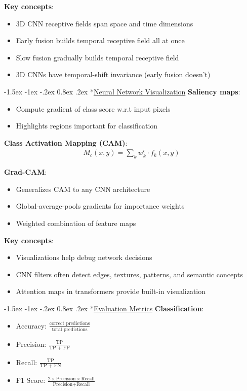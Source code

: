 \documentclass{article}
\makeatletter
\renewcommand\section{\@startsection{section}{1}{\z@}%
                                  {-1.5ex \@plus -1ex \@minus -.2ex}%
                                  {0.8ex \@plus.2ex}%
                                  {\normalfont\small\bfseries}}
\makeatother
\begin{document}
\begin{multicols}{3}
\textbf{Key concepts}:
\begin{itemize}
\item 3D CNN receptive fields span space and time dimensions
\item Early fusion builds temporal receptive field all at once
\item Slow fusion gradually builds temporal receptive field
\item 3D CNNs have temporal-shift invariance (early fusion doesn't)
\end{itemize}

\section*{\underline{Neural Network Visualization}}
\textbf{Saliency maps}:
\begin{itemize}
\item Compute gradient of class score w.r.t input pixels
\item Highlights regions important for classification
\end{itemize}

\textbf{Class Activation Mapping (CAM)}:
\begin{align*}
M_c(x,y) = \sum_k w_k^c \cdot f_k(x,y)
\end{align*}

\textbf{Grad-CAM}:
\begin{itemize}
\item Generalizes CAM to any CNN architecture
\item Global-average-pools gradients for importance weights
\item Weighted combination of feature maps
\end{itemize}

\textbf{Key concepts}:
\begin{itemize}
\item Visualizations help debug network decisions
\item CNN filters often detect edges, textures, patterns, and semantic concepts
\item Attention maps in transformers provide built-in visualization
\end{itemize}

\section*{\underline{Evaluation Metrics}}
\textbf{Classification}:
\begin{itemize}
\item Accuracy: $\frac{\text{correct predictions}}{\text{total predictions}}$
\item Precision: $\frac{\text{TP}}{\text{TP + FP}}$
\item Recall: $\frac{\text{TP}}{\text{TP + FN}}$
\item F1 Score: $\frac{2 \times \text{Precision} \times \text{Recall}}{\text{Precision} + \text{Recall}}$
\end{itemize}


\end{multicols}
\end{document}
